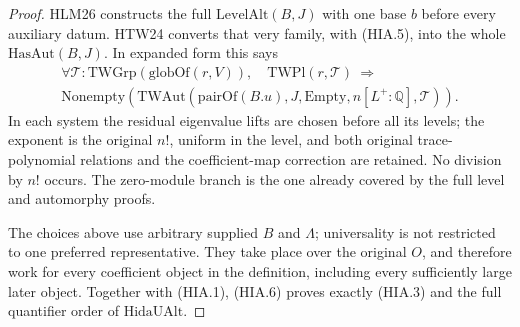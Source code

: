 \begin{proof}
HLM26 constructs the full \(\mathrm{LevelAlt}(B,J)\) with
one base \(b\) before every auxiliary datum.  HTW24 converts
that very family, with (HIA.5), into the whole
\(\mathrm{HasAut}(B,J)\).  In expanded form this says
\[
 \begin{gathered}
 \forall\mathcal T:\mathrm{TWGrp}(\mathrm{globOf}(r,V)),
 \quad\mathrm{TWPl}(r,\mathcal T)
 \ \Longrightarrow\\
 \mathrm{Nonempty}\!\left(
 \mathrm{TWAut}(\mathrm{pairOf}(B.u),J,\mathrm{Empty},
                   n[L^+:\mathbb Q],\mathcal T)\right).
 \end{gathered}
 \tag{HIA.6}
\]
In each system the residual eigenvalue lifts are chosen before
all its levels; the exponent is the original \(n!\), uniform
in the level, and both original trace-polynomial relations
and the coefficient-map correction are retained.  No
division by \(n!\) occurs.  The zero-module branch is the
one already covered by the full level and automorphy proofs.

The choices above use arbitrary supplied \(B\) and
\(\Lambda\); universality is not restricted to one preferred
representative.  They take place over the original \(O\),
and therefore work for every coefficient object in the
definition, including every sufficiently large later object.
Together with (HIA.1), (HIA.6) proves exactly (HIA.3) and
the full quantifier order of \(\mathrm{HidaUAlt}\).
\end{proof}

